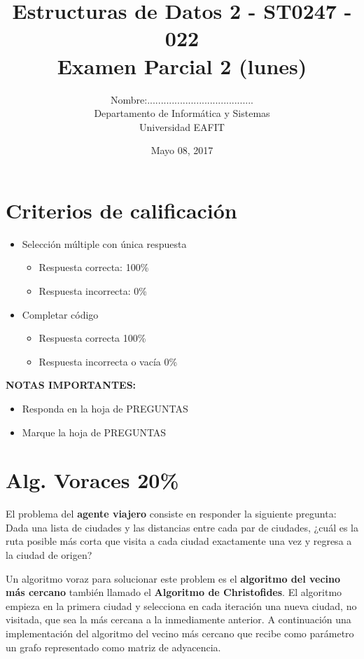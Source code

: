 \documentclass[twocolumn]{article}
\author{
Nombre:....................................... \\
    Departamento de Informática y Sistemas \\
    Universidad EAFIT \\
}
\title{
    Estructuras de Datos 2 - ST0247 - 022 \\
    Examen Parcial 2 (lunes)
}
\date{
    Mayo 08, 2017
}
\begin{document}
\vspace{-5cm}
\maketitle


\section*{Criterios de calificación}

\begin{itemize}
\item Selección múltiple con única respuesta
\begin{itemize}
\item Respuesta correcta: 100\%
\item Respuesta incorrecta: 0\%
\end{itemize}

\item Completar código
\begin{itemize}
\item Respuesta correcta 100\%
\item Respuesta incorrecta o vacía 0\% \\
\end{itemize}
\end{itemize}

\textbf{NOTAS IMPORTANTES:}
\begin{itemize}
	\item Responda en la hoja de PREGUNTAS
	\item Marque la hoja de PREGUNTAS
\end{itemize}

\section{Alg. Voraces 20\%}
El problema del \textbf{agente viajero} consiste en responder la siguiente pregunta: Dada
una lista de ciudades y las distancias entre cada par de ciudades, ¿cuál es la
ruta posible más corta que visita a cada ciudad exactamente una vez y regresa a la
ciudad de origen? 

Un algoritmo voraz para solucionar este problem es el \textbf{algoritmo del vecino más
cercano} también llamado el \textbf{Algoritmo de Christofides}. El algoritmo empieza en la primera ciudad y selecciona en
cada iteración una nueva ciudad, no visitada, que sea la más cercana a la inmediamente
anterior. A continuación una implementación del algoritmo del vecino más cercano
que recibe como parámetro un grafo representado como matriz de adyacencia. 
\end{document}
